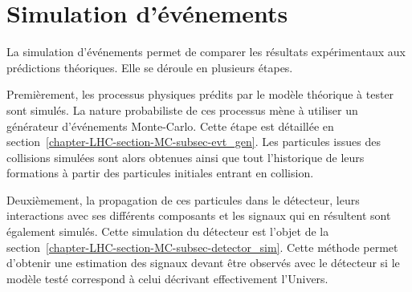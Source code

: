 \section{Simulation d'événements}\label{chapter-LHC-section-MC}
La simulation d'événements permet de comparer les résultats expérimentaux aux prédictions théoriques.
Elle se déroule en plusieurs étapes.
\par Premièrement, les processus physiques prédits par le modèle théorique à tester sont simulés.
La nature probabiliste de ces processus mène à utiliser un générateur d'événements Monte-Carlo.
Cette étape est détaillée en section~\ref{chapter-LHC-section-MC-subsec-evt_gen}.
Les particules issues des collisions simulées sont alors obtenues ainsi que tout l'historique de leurs formations à partir des particules initiales entrant en collision.
\par Deuxièmement, la propagation de ces particules dans le détecteur, leurs interactions avec ses différents composants et les signaux qui en résultent sont également simulés.
Cette simulation du détecteur est l'objet de la section~\ref{chapter-LHC-section-MC-subsec-detector_sim}.
Cette méthode permet d'obtenir une estimation des signaux devant être observés avec le détecteur si le modèle testé correspond à celui décrivant effectivement l'Univers.
